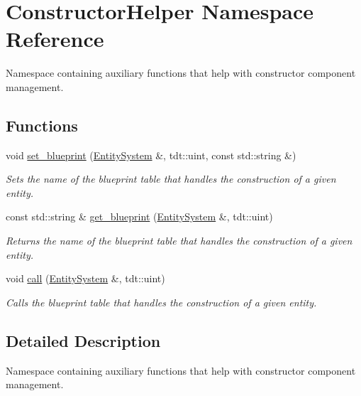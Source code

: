 \hypertarget{namespace_constructor_helper}{}\section{Constructor\+Helper Namespace Reference}
\label{namespace_constructor_helper}


Namespace containing auxiliary functions that help with constructor component management.  


\subsection*{Functions}
\begin{DoxyCompactItemize}
\item 
void \hyperlink{namespace_constructor_helper_abe8fa54810e2315996a8b58aa11e735e}{set\+\_\+blueprint} (\hyperlink{class_entity_system}{Entity\+System} \&, tdt\+::uint, const std\+::string \&)
\begin{DoxyCompactList}\small\item\em Sets the name of the blueprint table that handles the construction of a given entity. \end{DoxyCompactList}\item 
const std\+::string \& \hyperlink{namespace_constructor_helper_a428bb253f4eb6b7ae0204956c9e27cd3}{get\+\_\+blueprint} (\hyperlink{class_entity_system}{Entity\+System} \&, tdt\+::uint)
\begin{DoxyCompactList}\small\item\em Returns the name of the blueprint table that handles the construction of a given entity. \end{DoxyCompactList}\item 
void \hyperlink{namespace_constructor_helper_a6aada249839e2d79d57220b10edf50f6}{call} (\hyperlink{class_entity_system}{Entity\+System} \&, tdt\+::uint)
\begin{DoxyCompactList}\small\item\em Calls the blueprint table that handles the construction of a given entity. \end{DoxyCompactList}\end{DoxyCompactItemize}


\subsection{Detailed Description}
Namespace containing auxiliary functions that help with constructor component management. 

